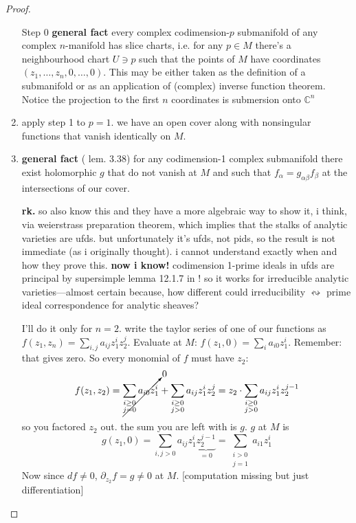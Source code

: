 \begin{proof}\leavevmode
\begin{enumerate}[label=\textbf{Step \arabic*}]
	\item[Step 0] \textbf{general fact} every complex codimension-\(p\) submanifold of any complex \(n\)-manifold has slice charts, i.e. for any \(p \in M\) there's a neighbourhood chart \(U \ni p\) such that the points of \(M\) have coordinates \((z_1,\ldots,z_n,0,\ldots,0)\). This may be either taken as the definition of a submanifold or as an application of (complex) inverse function theorem. Notice the projection to the first \(n\) coordinates is submersion onto \(\mathbb{C}^{n}\)
\item apply step 1 to \(p=1\). we have an open cover along with nonsingular functions that vanish identically on \(M\).
\item \textbf{general fact} (\cite{lec} lem. 3.38) for any codimension-1 complex submanifold there exist holomorphic \(g\) that do not vanish at \(M\) and such that \(f_\alpha=g_{\alpha \beta}f_\beta\) at the intersections of our cover.

	\textbf{rk.} so \cite{gri} also know this and they have a more algebraic way to show it, i think, via weierstrass preparation theorem, which implies that the stalks of analytic varieties are ufds. but unfortunately it's ufds, not pids, so the result is not immediate (as i originally thought). i cannot understand exactly when and how they prove this. \textbf{now i know!} codimension 1-prime ideals in ufds are principal by supersimple lemma 12.1.7 in \cite{sea}! so it works for irreducible analytic varieties---almost certain because, how different could irreducibility \(\leftrightsquigarrow\) prime ideal correspondence for analytic sheaves?

	I'll do it only for \(n=2\). write the taylor series of one of our functions as \(f(z_1,z_n)=\sum_{i,j}a_{ij}z_1^iz_2^j\). Evaluate at \(M\): \(f(z_1,0)=\sum_i a_{i 0}z^i_1\). Remember: that gives zero. So every  monomial of \(f\) must have  \(z_2\):
	\[f(z_1,z_2)=\cancelto{0}{\sum_{\substack{i \geq 0 \\ j=0}} a_{i 0}z_1^i}+\sum_{\substack{i\geq 0 \\ j>0}}a_{ij}z_1^iz_2^j=z_2\cdot \sum_{\substack{i\geq 0 \\ j>0}}a_{ij}z_1^iz_2^{j-1}\]
so you factored \(z_2\) out. the sum you are left with is \(g\). \(g\) at \(M\) is
\[g(z_1,0)=\sum_{i,j>0}a_{ij}z_1^i\underbrace{z_2^{j-1}}_{=0}=\sum_{\substack{i>0 \\ j=1}}a_{i1}z_1^i\]
Now since \(df \neq 0\), \(\partial_{z_2}f=g \neq 0\) at \(M\). [computation missing but just differentiation]


\end{enumerate}
\end{proof}
